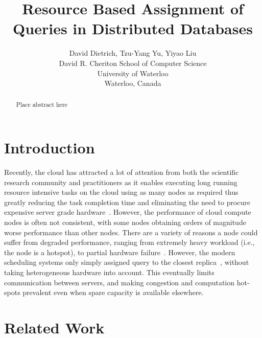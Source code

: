 \documentclass[]{acm_proc_article-sp}
\begin{document}
\title{Resource Based Assignment of Queries in Distributed Databases}

\author{
  David Dietrich, Tzu-Yang Yu, Yiyao Liu \\
  David R. Cheriton School of Computer Science \\
  University of Waterloo \\
  Waterloo, Canada \\
}

\maketitle


\begin{abstract}
Place abstract here
\end{abstract}

\section{Introduction}

Recently, the cloud has attracted a lot of attention from both the scientific research community and practitioners as it enables executing long running resource intensive tasks on the cloud using as many nodes as required thus greatly reducing the task completion time and eliminating the need to procure expensive server grade hardware~\cite{Agrawal:2008:CRD:1462571.1462573}. However, the performance of cloud compute nodes is often not consistent, with some nodes obtaining orders of magnitude worse performance than other nodes. There are a variety of reasons a node could suffer from degraded performance, ranging from extremely heavy workload (i.e., the node is a hotspot), to partial hardware failure~\cite{citeulike:6656195}. However, the modern scheduling systems only simply assigned query to the closest replica~\cite{borthakur-07}, without taking heterogeneous hardware into account. This eventually limits communication between servers, and making congestion and computation hot-spots prevalent even when spare capacity is available elsewhere.


\section{Related Work}
\end{document}
